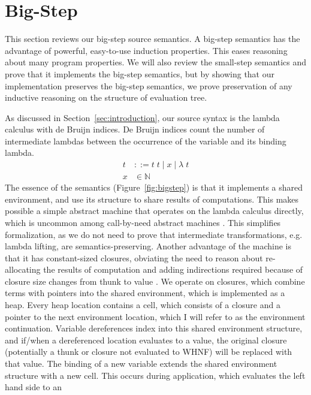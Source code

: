 \section{Big-Step \ce} \label{sec:cem_big}

This section reviews our big-step source semantics. A big-step semantics
has the advantage of powerful, easy-to-use induction properties. This eases
reasoning about many program properties. We will also review the small-step
semantics and prove that it implements the big-step semantics, but by showing
that our implementation preserves the big-step semantics, we prove preservation
of any inductive reasoning on the structure of evaluation tree.  

As discussed in Section~\ref{sec:introduction}, our source syntax is the lambda
calculus with de Bruijn indices. De Bruijn indices count the number of
intermediate lambdas between the occurrence of the variable and its binding
lambda.  
\begin{align*}
 t &::= t \; t \; | \; x \; | \;  \lambda \; t \\
 x &\in \mathbb{N}
\end{align*}
The essence of the \ce semantics (Figure~\ref{fig:bigstep}) is that it
implements a shared environment, and use its structure to share results of
computations. This makes possible a simple abstract machine that operates on the
lambda calculus directly, which is uncommon among call-by-need abstract machines
\cite{jonesstg,launchburynatural,TIM,johnsson1984efficient}. This simplifies
formalization, as we do not need to prove that intermediate transformations,
e.g. lambda lifting, are semantics-preserving. Another advantage of the \ce
machine is that it has constant-sized closures, obviating the need to reason
about re-allocating the results of computation and adding indirections required
because of closure size changes from thunk to value \cite{jonesstg}. We operate
on closures, which combine terms with pointers into the shared environment,
which is implemented as a heap. Every heap location contains a cell, which
consists of a closure and a pointer to the next environment location, which I
will refer to as the environment continuation.  Variable dereferences index into
this shared environment structure, and if/when a dereferenced location evaluates
to a value, the original closure (potentially a thunk or closure not evaluated
to WHNF) will be replaced with that value. The binding of a new variable extends
the shared environment structure with a new
cell. This occurs during application, which evaluates the left hand side to an
